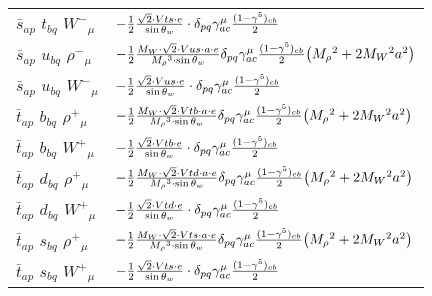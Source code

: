 \begin{center}
\begin{tabular}{|l|l|}
$\bar{s}{}_{a p }$ \phantom{-} $t{}_{b q }$ \phantom{-} $W^-{}_{\mu }$ \phantom{-}  &
	$-\frac{1}{2}\frac{\sqrt{2} \cdot Vts \cdot e}{ \sin{\theta}_w}\cdot \delta_{p q} \gamma_{a c}^\mu {(1-\gamma^5)_{c b}\over 2} $\\[2mm]
$\bar{s}{}_{a p }$ \phantom{-} $u{}_{b q }$ \phantom{-} $\rho^-{}_{\mu }$ \phantom{-}  &
	$-\frac{1}{2}\frac{ M_W \cdot\sqrt{2} \cdot Vus \cdot a \cdot e}{ M_\rho{}^3  \cdot \sin{\theta}_w}\delta_{p q} \gamma_{a c}^\mu {(1-\gamma^5)_{c b}\over 2} \big( M_\rho{}^2 +2 M_W{}^2  a{}^2 \big)$\\[2mm]
$\bar{s}{}_{a p }$ \phantom{-} $u{}_{b q }$ \phantom{-} $W^-{}_{\mu }$ \phantom{-}  &
	$-\frac{1}{2}\frac{\sqrt{2} \cdot Vus \cdot e}{ \sin{\theta}_w}\cdot \delta_{p q} \gamma_{a c}^\mu {(1-\gamma^5)_{c b}\over 2} $\\[2mm]
$\bar{t}{}_{a p }$ \phantom{-} $b{}_{b q }$ \phantom{-} $\rho^+{}_{\mu }$ \phantom{-}  &
	$-\frac{1}{2}\frac{ M_W \cdot\sqrt{2} \cdot Vtb \cdot a \cdot e}{ M_\rho{}^3  \cdot \sin{\theta}_w}\delta_{p q} \gamma_{a c}^\mu {(1-\gamma^5)_{c b}\over 2} \big( M_\rho{}^2 +2 M_W{}^2  a{}^2 \big)$\\[2mm]
$\bar{t}{}_{a p }$ \phantom{-} $b{}_{b q }$ \phantom{-} $W^+{}_{\mu }$ \phantom{-}  &
	$-\frac{1}{2}\frac{\sqrt{2} \cdot Vtb \cdot e}{ \sin{\theta}_w}\cdot \delta_{p q} \gamma_{a c}^\mu {(1-\gamma^5)_{c b}\over 2} $\\[2mm]
$\bar{t}{}_{a p }$ \phantom{-} $d{}_{b q }$ \phantom{-} $\rho^+{}_{\mu }$ \phantom{-}  &
	$-\frac{1}{2}\frac{ M_W \cdot\sqrt{2} \cdot Vtd \cdot a \cdot e}{ M_\rho{}^3  \cdot \sin{\theta}_w}\delta_{p q} \gamma_{a c}^\mu {(1-\gamma^5)_{c b}\over 2} \big( M_\rho{}^2 +2 M_W{}^2  a{}^2 \big)$\\[2mm]
$\bar{t}{}_{a p }$ \phantom{-} $d{}_{b q }$ \phantom{-} $W^+{}_{\mu }$ \phantom{-}  &
	$-\frac{1}{2}\frac{\sqrt{2} \cdot Vtd \cdot e}{ \sin{\theta}_w}\cdot \delta_{p q} \gamma_{a c}^\mu {(1-\gamma^5)_{c b}\over 2} $\\[2mm]
$\bar{t}{}_{a p }$ \phantom{-} $s{}_{b q }$ \phantom{-} $\rho^+{}_{\mu }$ \phantom{-}  &
	$-\frac{1}{2}\frac{ M_W \cdot\sqrt{2} \cdot Vts \cdot a \cdot e}{ M_\rho{}^3  \cdot \sin{\theta}_w}\delta_{p q} \gamma_{a c}^\mu {(1-\gamma^5)_{c b}\over 2} \big( M_\rho{}^2 +2 M_W{}^2  a{}^2 \big)$\\[2mm]
$\bar{t}{}_{a p }$ \phantom{-} $s{}_{b q }$ \phantom{-} $W^+{}_{\mu }$ \phantom{-}  &
	$-\frac{1}{2}\frac{\sqrt{2} \cdot Vts \cdot e}{ \sin{\theta}_w}\cdot \delta_{p q} \gamma_{a c}^\mu {(1-\gamma^5)_{c b}\over 2} $\\[2mm]

\end{tabular}
\end{center}
